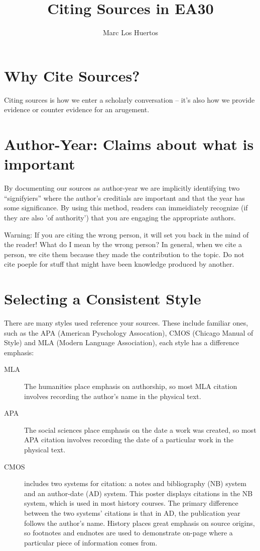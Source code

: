 \documentclass{article}\usepackage[]{graphicx}\usepackage[]{color}
\author{Marc Los Huertos}
\title{Citing Sources in EA30}
\begin{document}
\maketitle

\section{Why Cite Sources?}

Citing sources is how we enter a scholarly conversation -- it's also how we provide evidence or counter evidence for an arugement. 

\section{Author-Year: Claims about what is important}

By documenting our sources as author-year we are implicitly identifying two ``signifyiers'' where the author's creditials are important and that the year has some significance. By using this method, readers can immeidiately recognize (if they are also 'of authority') that you are engaging the appropriate authors. 

Warning: If you are citing the wrong person, it will set you back in the mind of the reader! What do I mean by the wrong person?  In general, when we cite a person, we cite them because they made the contribution to the topic. Do not cite poeple for stuff that might have been knowledge produced by another. 

\section{Selecting a Consistent Style}

There are many styles used reference your sources. These include familiar ones, such as the APA (American Pyschology Assocation), CMOS (Chicago Manual of Style) and MLA (Modern Language Association), each style has a difference emphasis:

\begin{description}
  \item[MLA] The humanities
place emphasis on authorship, so most
MLA citation involves recording the
author’s name in the physical text.
  \item[APA] The social
sciences place emphasis on the date a
work was created, so most APA citation
involves recording the date of a
particular work in the physical text.
  \item[CMOS] includes
two systems for citation: a notes and
bibliography (NB) system and an author-date
(AD) system. This poster displays citations in
the NB system, which is used in most history
courses. The primary difference between the
two systems’ citations is that in AD, the
publication year follows the author’s name.
History places great emphasis on source
origins, so footnotes and endnotes are used
to demonstrate on-page where a particular
piece of information comes from.
\end{description}
\end{document}
